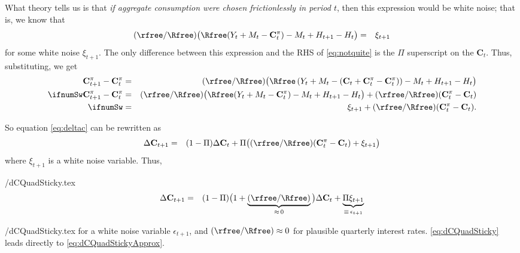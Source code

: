 What theory tells us is that {\it if aggregate consumption were chosen
frictionlessly in period $t$}, then this expression would be white
noise; that is, we know that
\begin{eqnarray}
        (\rfree/\Rfree)\big(\Rfree(Y_{t}+ M_{t}-\mathbf{C}_{t}^{{\pi}})-M_{t}+H_{t+1}-H_{t}\big) & = & \xi_{t+1}  \nonumber
\end{eqnarray}
for some white noise $\xi_{t+1}$.  The only difference between this expression
and the RHS of \eqref{eq:notquite} is the $\Pi$ superscript on the
$\mathbf{C}_{t}$.  Thus, substituting, we get
\begin{eqnarray}
        \mathbf{C}_{t+1}^{{\pi}}-\mathbf{C}_{t}^{{\pi}} & = & (\rfree/\Rfree)\big(\Rfree\left(Y_{t}+M_{t}-(\mathbf{C}_{t}+\mathbf{C}_{t}^{{\pi}}-\mathbf{C}_{t}^{{\pi}})\right)-M_{t}+H_{t+1}-H_{t}\big)     \nonumber
\\ \ifnumSw      \mathbf{C}_{t+1}^{{\pi}}-\mathbf{C}_{t}^{{\pi}} & = & (\rfree/\Rfree)\big(\Rfree(Y_{t}+M_{t}-\mathbf{C}_{t}^{{\pi}})-M_{t}+H_{t+1}-H_{t}\big) + (\rfree/\Rfree) (\mathbf{C}_{t}^{{\pi}}-\mathbf{C}_{t}) \nonumber
\\ \ifnumSw  & = & \xi_{t+1} + (\rfree/\Rfree) (\mathbf{C}_{t}^{{\pi}}-\mathbf{C}_{t}).  \nonumber
\end{eqnarray}

So equation \eqref{eq:deltac} can be rewritten as
\begin{eqnarray}
    \Delta \mathbf{C}_{t+1} & = & (1-\Pi)
        \Delta \mathbf{C}_{t} + \Pi \big((\rfree/\Rfree)(\mathbf{C}_{t}^{{\pi}}-\mathbf{C}_{t}) + \xi_{t+1}\big)  \nonumber
\label{eq:deltac2}
\end{eqnarray}
where $\xi _{t+1}$ is a white noise variable.
Thus,
\begin{verbatimwrite}{\eq/dCQuadSticky.tex}
\begin{eqnarray}
    \Delta \mathbf{C}_{t+1} & = & (1-\Pi)\big(1+\underbrace{(\rfree/\Rfree)}_{\approx\,0}\big) \Delta \mathbf{C}_{t} + \underbrace{\Pi \xi_{t+1}}_{\equiv\,\epsilon_{t+1}} \label{eq:dCQuadSticky}
\end{eqnarray}
\end{verbatimwrite}
 \eq/dCQuadSticky.tex
for a white noise variable $\epsilon_{t+1}$, and $(\rfree/\Rfree) \approx 0$
for plausible quarterly interest rates.  \eqref{eq:dCQuadSticky}
leads directly to \eqref{eq:dCQuadStickyApprox}.
